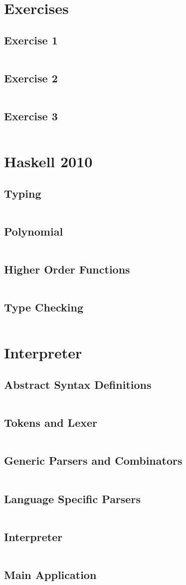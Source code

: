 \documentclass[a4paper,9pt]{article}
\newcommand{\hsfile}[1]{\inputminted[breaklines]{haskell}{../haskell/#1.hs}}
\begin{document}
\section{Exercises}
\subsection{Exercise 1}
\hsfile{ex01/ex01}
\subsection{Exercise 2}
\hsfile{ex02/ex02}
\subsection{Exercise 3}
\hsfile{ex03/ex03}
\section{Haskell 2010}
\subsection{Typing}
\hsfile{exam2010/problem_1}
\subsection{Polynomial}
\hsfile{exam2010/problem_2}
\subsection{Higher Order Functions}
\hsfile{exam2010/problem_3}
\subsection{Type Checking}
\hsfile{exam2010/problem_4}
\section{Interpreter}
\subsection{Abstract Syntax Definitions}
\hsfile{interpreter/AbsSyn}
\subsection{Tokens and Lexer}
\hsfile{interpreter/Scanner}
\subsection{Generic Parsers and Combinators}
\hsfile{interpreter/ParserCombis2}
\subsection{Language Specific Parsers}
\hsfile{interpreter/Parser2}
\subsection{Interpreter}
\hsfile{interpreter/Interpreter}
\subsection{Main Application}
\hsfile{interpreter/Main}
\end{document}
